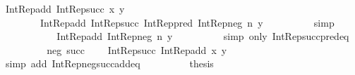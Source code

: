 \begin{isabellebody}
\ {\isachardoublequoteopen}Int{\isacharunderscore}{\kern0pt}Rep{\isacharunderscore}{\kern0pt}add\ {\isacharparenleft}{\kern0pt}Int{\isacharunderscore}{\kern0pt}Rep{\isacharunderscore}{\kern0pt}succ\ x{\isacharparenright}{\kern0pt}\ y\ {\isacharequal}{\kern0pt}\isanewline
\ \ \ \ \ \ \ \ Int{\isacharunderscore}{\kern0pt}Rep{\isacharunderscore}{\kern0pt}add\ {\isacharparenleft}{\kern0pt}Int{\isacharunderscore}{\kern0pt}Rep{\isacharunderscore}{\kern0pt}succ\ {\isacharparenleft}{\kern0pt}Int{\isacharunderscore}{\kern0pt}Rep{\isacharunderscore}{\kern0pt}pred\ {\isacharparenleft}{\kern0pt}Int{\isacharunderscore}{\kern0pt}Rep{\isacharunderscore}{\kern0pt}neg\ n{\isacharparenright}{\kern0pt}{\isacharparenright}{\kern0pt}{\isacharparenright}{\kern0pt}\ y{\isachardoublequoteclose}\isanewline
\ \ \ \ \ \ \ \ \isamarkupfalse%
\ simp\isanewline
\ \ \ \ \ \ \isamarkupfalse%
\ \isamarkupfalse%
\ {\isachardoublequoteopen}{\isachardot}{\kern0pt}{\isachardot}{\kern0pt}{\isachardot}{\kern0pt}\ {\isacharequal}{\kern0pt}\ Int{\isacharunderscore}{\kern0pt}Rep{\isacharunderscore}{\kern0pt}add\ {\isacharparenleft}{\kern0pt}Int{\isacharunderscore}{\kern0pt}Rep{\isacharunderscore}{\kern0pt}neg\ n{\isacharparenright}{\kern0pt}\ y{\isachardoublequoteclose}\isanewline
\ \ \ \ \ \ \ \ \isamarkupfalse%
\ {\isacharparenleft}{\kern0pt}simp\ only{\isacharcolon}{\kern0pt}\ Int{\isacharunderscore}{\kern0pt}Rep{\isacharunderscore}{\kern0pt}succ{\isacharunderscore}{\kern0pt}pred{\isacharunderscore}{\kern0pt}eq{\isacharparenright}{\kern0pt}\isanewline
\ \ \ \ \ \ \isamarkupfalse%
\ \isamarkupfalse%
\ neg\ succ\ \isamarkupfalse%
\ {\isachardoublequoteopen}{\isachardot}{\kern0pt}{\isachardot}{\kern0pt}{\isachardot}{\kern0pt}\ {\isacharequal}{\kern0pt}\ Int{\isacharunderscore}{\kern0pt}Rep{\isacharunderscore}{\kern0pt}succ\ {\isacharparenleft}{\kern0pt}Int{\isacharunderscore}{\kern0pt}Rep{\isacharunderscore}{\kern0pt}add\ x\ y{\isacharparenright}{\kern0pt}{\isachardoublequoteclose}\isanewline
\ \ \ \ \ \ \ \ \isamarkupfalse%
\ {\isacharparenleft}{\kern0pt}simp\ add{\isacharcolon}{\kern0pt}\ Int{\isacharunderscore}{\kern0pt}Rep{\isacharunderscore}{\kern0pt}neg{\isacharunderscore}{\kern0pt}succ{\isacharunderscore}{\kern0pt}add{\isacharunderscore}{\kern0pt}eq{\isacharparenright}{\kern0pt}\isanewline
\ \ \ \ \ \ \isamarkupfalse%
\ \isamarkupfalse%
\ {\isacharquery}{\kern0pt}thesis\ \isacommand{{\isachardot}{\kern0pt}}\isamarkupfalse%
\isanewline

\end{isabellebody}
